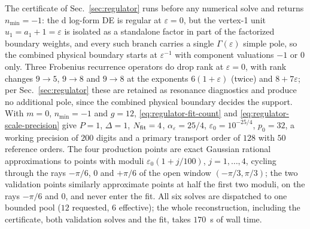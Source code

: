 \documentclass[11pt,a4paper]{article}
\numberwithin{table}{section}
\begin{document}
The certificate of Sec.~\ref{sec:regulator} runs before any numerical solve and returns
$n_{\min}=-1$: the d log-form DE is regular at $\varepsilon=0$, but the vertex-1 unit
$u_1=a_1+1=\varepsilon$ is isolated as a standalone factor in part of the factorized boundary
weights, and every such branch carries a single $\Gamma(\varepsilon)$ simple pole, so the
combined physical boundary starts at $\varepsilon^{-1}$ with component valuations $-1$ or
$0$ only. Three Frobenius recurrence operators do drop rank at $\varepsilon=0$, with rank
changes $9\to5$, $9\to8$ and $9\to8$ at the exponents $6(1+\varepsilon)$ (twice) and
$8+7\varepsilon$; per
Sec.~\ref{sec:regulator} these are retained as resonance diagnostics and produce no additional
pole, since the combined physical boundary decides the support. With $m=0$, $n_{\min}=-1$ and
$g=12$, \eqref{eq:regulator-fit-count} and \eqref{eq:regulator-scale-precision} give
$P=1$, $\Delta=1$, $N_{\rm fit}=4$, $\alpha_\varepsilon=25/4$, $\varepsilon_0=10^{-25/4}$,
$p_0=32$, a working
precision of $200$ digits and a primary transport order of $128$ with $50$ reference orders.
The four production points are exact Gaussian rational approximations to points with moduli
$\varepsilon_0(1+j/100)$, $j=1,\ldots,4$, cycling through the rays $-\pi/6$, $0$ and $+\pi/6$ of the
open window $(-\pi/3,\pi/3)$; the two validation points similarly approximate points at half the first two moduli, on the
rays $-\pi/6$ and $0$, and never enter the fit.
All six solves are dispatched to one bounded pool
($12$ requested, $6$ effective); the whole reconstruction, including the certificate, both
validation solves and the fit, takes $170$~s of wall time.
\end{document}
